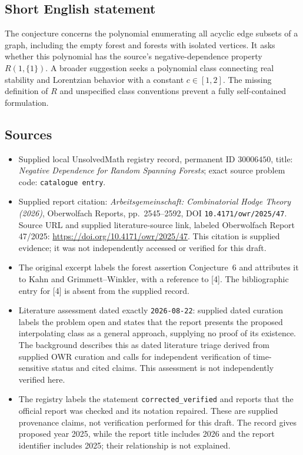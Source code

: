 \documentclass[11pt]{article}
\begin{document}
\subsection{Short English statement}
The conjecture concerns the polynomial enumerating all acyclic edge subsets of a graph, including the empty forest and forests with isolated vertices. It asks whether this polynomial has the source's negative-dependence property \(R(1,\{1\})\). A broader suggestion seeks a polynomial class connecting real stability and Lorentzian behavior with a constant \(c\in[1,2]\). The missing definition of \(R\) and unspecified class conventions prevent a fully self-contained formulation.
\subsection{Sources}
\begin{itemize}
\item Supplied local UnsolvedMath registry record, permanent ID \(30006450\), title: \emph{Negative Dependence for Random Spanning Forests}; exact source problem code: \texttt{catalogue entry}.
\item Supplied report citation: \emph{Arbeitsgemeinschaft: Combinatorial Hodge Theory (2026)}, Oberwolfach Reports, pp.~2545--2592, DOI \texttt{10.4171/owr/2025/47}. Source URL and supplied literature-source link, labeled Oberwolfach Report 47/2025: \url{https://doi.org/10.4171/owr/2025/47}. This citation is supplied evidence; it was not independently accessed or verified for this draft.
\item The original excerpt labels the forest assertion Conjecture~6 and attributes it to Kahn and Grimmett--Winkler, with a reference to [4]. The bibliographic entry for [4] is absent from the supplied record.
\item Literature assessment dated exactly \texttt{2026-08-22}: supplied dated curation labels the problem open and states that the report presents the proposed interpolating class as a general approach, supplying no proof of its existence. The background describes this as dated literature triage derived from supplied OWR curation and calls for independent verification of time-sensitive status and cited claims. This assessment is not independently verified here.
\item The registry labels the statement \texttt{corrected\_verified} and reports that the official report was checked and its notation repaired. These are supplied provenance claims, not verification performed for this draft. The record gives proposed year 2025, while the report title includes 2026 and the report identifier includes 2025; their relationship is not explained.
\end{itemize}
\end{document}
